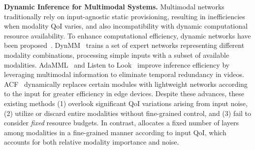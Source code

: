 \textbf{Dynamic Inference for Multimodal Systems.}
Multimodal networks traditionally rely on input-agnostic static provisioning, resulting in inefficiencies when modality QoI varies, and also incompatibility with dynamic computational resource availability. 
To enhance computational efficiency, dynamic networks have been proposed~\cite{xue2023dynamic, panda2021adamml, gao2020listen,cai2024ACF, mullapudi2018hydranets}. 
DynMM~\cite{xue2023dynamic} trains a set of expert networks representing different modality combinations, processing simple inputs with a subset of available modalities. 
AdaMML~\cite{panda2021adamml} and Listen to Look~\cite{gao2020listen} improve inference efficiency by leveraging multimodal information to eliminate temporal redundancy in videos. ACF~\cite{cai2024ACF} dynamically replaces certain modules with lightweight networks according to the input for greater efficiency in edge devices. 
Despite these advances, these existing methods (1) overlook significant QoI variations arising from input noise, (2) utilize or discard entire modalities without fine-grained control, and (3) fail to consider \emph{fixed} resource budgets. In contrast, \name allocates a fixed number of layers among modalities in a fine-grained manner according to input QoI, which accounts for both relative modality importance and noise.  








